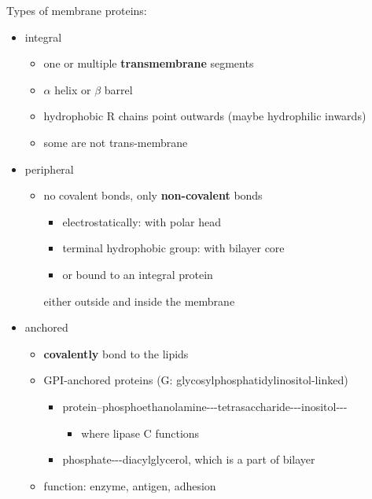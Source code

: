 Types of membrane proteins:

\begin{itemize}
	\item
	integral
	
	\begin{itemize}
		\item
		one or multiple \textbf{transmembrane} segments
		\item
		\(\alpha\) helix or \(\beta\) barrel
		\item hydrophobic R chains point outwards (maybe hydrophilic inwards)
		\item
		some are not trans-membrane
	\end{itemize}
	\item
	peripheral
	
	\begin{itemize}
		\item
		no covalent bonds, only \textbf{non-covalent} bonds
		
		\begin{itemize}
			\item
			electrostatically: with polar head
			\item
			terminal hydrophobic group: with bilayer core
			\item
			or bound to an integral protein
		\end{itemize}
		
		either outside and inside the membrane
	\end{itemize}
	\item
	anchored
	
	\begin{itemize}
		\item
		\textbf{covalently} bond to the lipids
		\item
		GPI-anchored proteins (G: glycosylphosphatidylinositol-linked)
		
		\begin{itemize}
			\item
			protein--phosphoethanolamine-\/-\/-tetrasaccharide-\/-\/-inositol-\/-\/-
			
			\begin{itemize}
				\item
				where lipase C functions
			\end{itemize}
			\item
			phosphate-\/-\/-diacylglycerol, which is a part of bilayer
		\end{itemize}
		\item
		function: enzyme, antigen, adhesion
	\end{itemize}
\end{itemize}

